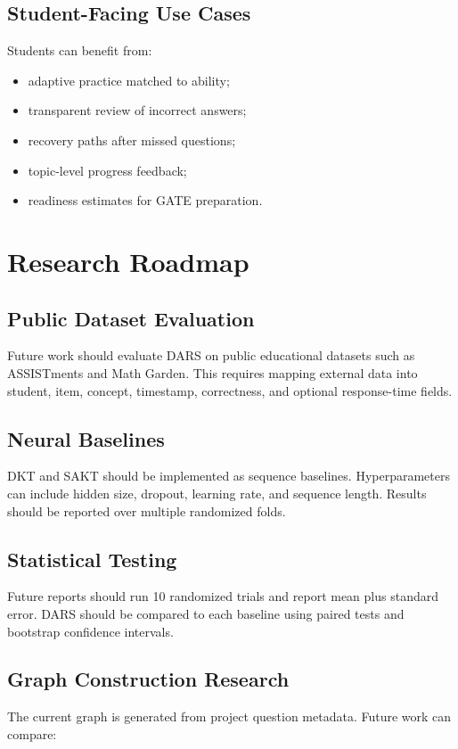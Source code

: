 \documentclass[12pt,a4paper]{report}
\begin{document}
\section{Student-Facing Use Cases}
Students can benefit from:

\begin{itemize}[leftmargin=*]
  \item adaptive practice matched to ability;
  \item transparent review of incorrect answers;
  \item recovery paths after missed questions;
  \item topic-level progress feedback;
  \item readiness estimates for GATE preparation.
\end{itemize}

\chapter{Research Roadmap}
\section{Public Dataset Evaluation}
Future work should evaluate DARS on public educational datasets such as ASSISTments and Math Garden. This requires mapping external data into student, item, concept, timestamp, correctness, and optional response-time fields.

\section{Neural Baselines}
DKT and SAKT should be implemented as sequence baselines. Hyperparameters can include hidden size, dropout, learning rate, and sequence length. Results should be reported over multiple randomized folds.

\section{Statistical Testing}
Future reports should run 10 randomized trials and report mean plus standard error. DARS should be compared to each baseline using paired tests and bootstrap confidence intervals.

\section{Graph Construction Research}
The current graph is generated from project question metadata. Future work can compare:
\end{document}

